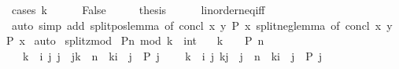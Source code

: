 \begin{isabellebody}
%
\isadelimproof
%
\endisadelimproof
%
\isatagproof
{}\isamarkupfalse%
\ {\isacharparenleft}{\kern0pt}cases\ {\isachardoublequoteopen}k\ {\isacharequal}{\kern0pt}\ {}{\isachardoublequoteclose}{\isacharparenright}{\kern0pt}\isanewline
\ \ \isamarkupfalse%
\ False\isanewline
\ \ \isamarkupfalse%
\ \isamarkupfalse%
\ {\isacharquery}{\kern0pt}thesis\isanewline
\ \ \ \ \isamarkupfalse%
\ linorder{\isacharunderscore}{\kern0pt}neq{\isacharunderscore}{\kern0pt}iff\isanewline
\ \ \ \ \isamarkupfalse%
\ {\isacharparenleft}{\kern0pt}auto\ simp\ add{\isacharcolon}{\kern0pt}\ split{\isacharunderscore}{\kern0pt}pos{\isacharunderscore}{\kern0pt}lemma\ {\isacharbrackleft}{\kern0pt}of\ concl{\isacharcolon}{\kern0pt}\ {\isachardoublequoteopen}{\isasymlambda}x\ y{\isachardot}{\kern0pt}\ P\ x{\isachardoublequoteclose}{\isacharbrackright}{\kern0pt}\ split{\isacharunderscore}{\kern0pt}neg{\isacharunderscore}{\kern0pt}lemma\ {\isacharbrackleft}{\kern0pt}of\ concl{\isacharcolon}{\kern0pt}\ {\isachardoublequoteopen}{\isasymlambda}x\ y{\isachardot}{\kern0pt}\ P\ x{\isachardoublequoteclose}{\isacharbrackright}{\kern0pt}{\isacharparenright}{\kern0pt}\isanewline
{}\isamarkupfalse%
\ auto%
\endisatagproof
{\isafoldproof}%
%
\isadelimproof
\isanewline
%
\endisadelimproof
\isanewline
{}\isamarkupfalse%
\ split{\isacharunderscore}{\kern0pt}zmod{\isacharcolon}{\kern0pt}\isanewline
\ {\isachardoublequoteopen}P{\isacharparenleft}{\kern0pt}n\ mod\ k\ {\isacharcolon}{\kern0pt}{\isacharcolon}{\kern0pt}\ int{\isacharparenright}{\kern0pt}\ {\isacharequal}{\kern0pt}\isanewline
\ \ {\isacharparenleft}{\kern0pt}{\isacharparenleft}{\kern0pt}k\ {\isacharequal}{\kern0pt}\ {}\ {\isasymlongrightarrow}\ P\ n{\isacharparenright}{\kern0pt}\ {\isasymand}\isanewline
\ \ \ {\isacharparenleft}{\kern0pt}{}{\isacharless}{\kern0pt}k\ {\isasymlongrightarrow}\ {\isacharparenleft}{\kern0pt}{\isasymforall}i\ j{\isachardot}{\kern0pt}\ {}{\isasymle}j\ {\isasymand}\ j{\isacharless}{\kern0pt}k\ {\isasymand}\ n\ {\isacharequal}{\kern0pt}\ k{\isacharasterisk}{\kern0pt}i\ {\isacharplus}{\kern0pt}\ j\ {\isasymlongrightarrow}\ P\ j{\isacharparenright}{\kern0pt}{\isacharparenright}{\kern0pt}\ {\isasymand}\isanewline
\ \ \ {\isacharparenleft}{\kern0pt}k{\isacharless}{\kern0pt}{}\ {\isasymlongrightarrow}\ {\isacharparenleft}{\kern0pt}{\isasymforall}i\ j{\isachardot}{\kern0pt}\ k{\isacharless}{\kern0pt}j\ {\isasymand}\ j{\isasymle}{}\ {\isasymand}\ n\ {\isacharequal}{\kern0pt}\ k{\isacharasterisk}{\kern0pt}i\ {\isacharplus}{\kern0pt}\ j\ {\isasymlongrightarrow}\ P\ j{\isacharparenright}{\kern0pt}{\isacharparenright}{\kern0pt}{\isacharparenright}{\kern0pt}{\isachardoublequoteclose}\isanewline

\end{isabellebody}
